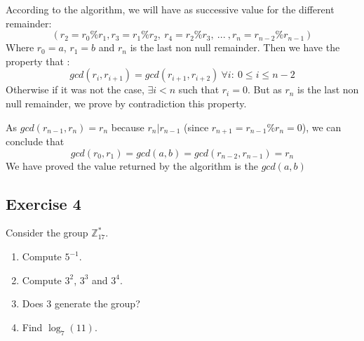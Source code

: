 \begin{solution}
	According to the algorithm, we will have as successive value for the different remainder:
	\[(r_2 = r_0 \% r_1, r_3 = r_1 \% r_2, \ r_4 = r_2 \% r_3, \ ... \ , r_n =  r_{n-2} \% r_{n-1})\]
	Where $r_0 = a$, $r_1 = b$ and $r_n$ is the last non null remainder. Then we have the property that :
	\[ gcd(r_{i}, r_{i+1}) = gcd(r_{i+1}, r_{i+2}) \ \forall i : \ 0 \leq i \leq n - 2 \]
	Otherwise if it was not the case, $\exists i < n $ such that $r_i = 0$. But as $r_n$ is the last non null remainder, we prove by contradiction this property.

	As $gcd(r_{n-1}, r_n) = r_n $ because $r_n | r_{n-1}$ (since $r_{n+1} = r_{n-1} \% r_n = 0$), we can conclude that
	\[ gcd(r_0, r_1) = gcd(a, b) = gcd(r_{n-2}, r_{n-1}) = r_n\]
	We have proved the value returned by the algorithm is the $gcd(a,b)$
\end{solution}



\subsection{Exercise 4}

Consider the group $\mathbb{Z}^{\ast}_{17}$.
\begin{enumerate}
	\item Compute $5^{-1}$.
	\item Compute $3^2$, $3^3$ and $3^4$.
	\item Does $3$ generate the group?
	\item Find $\log_{7}(11)$.
\end{enumerate}


